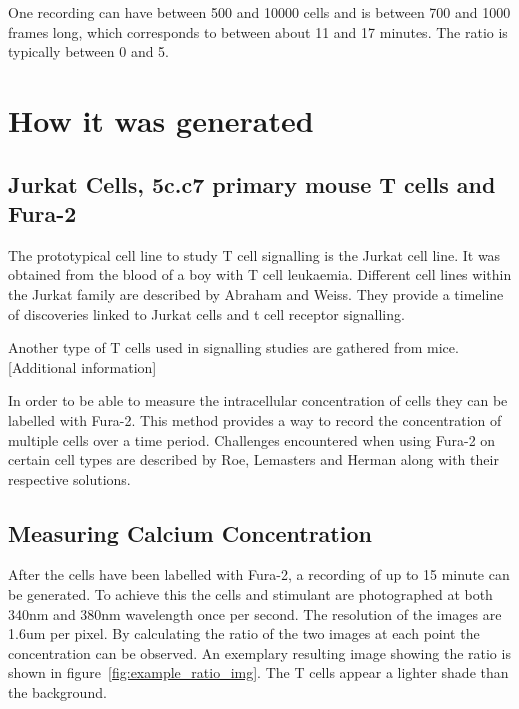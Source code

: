 One recording can have between 500 and 10000 cells and is between 700 and 1000 frames long, which corresponds to between about 11 and 17 minutes. The ratio is typically between 0 and 5.


\section{How it was generated}

\subsection{Jurkat Cells, 5c.c7 primary mouse T cells and Fura-2}

The prototypical cell line to study T cell signalling is the Jurkat cell line.\cite{morgan2023} It was obtained from the blood of a boy with T cell leukaemia.\cite{schneider1977} Different cell lines within the Jurkat family are described by Abraham and Weiss.\cite{abraham2004} They provide a timeline of discoveries linked to Jurkat cells and t cell receptor signalling.

Another type of T cells used in signalling studies are gathered from mice. [Additional information]

In order to be able to measure the intracellular \Calcium concentration of cells they can be labelled with Fura-2. This method provides a way to record the \Calcium concentration of multiple cells over a time period.\cite{martinez2017} Challenges encountered when using Fura-2 on certain cell types are described by Roe, Lemasters and Herman along with their respective solutions.\cite{roe1990}

\subsection{Measuring Calcium Concentration}

After the cells have been labelled with Fura-2, a recording of up to 15 minute can be generated. To achieve this the cells and stimulant are photographed at both 340nm and 380nm wavelength once per second. The resolution of the images are 1.6um per pixel. By calculating the ratio of the two images at each point the \Calcium concentration can be observed. An exemplary resulting image showing the ratio is shown in figure~\ref{fig:example_ratio_img}. The T cells appear a lighter shade than the background.

